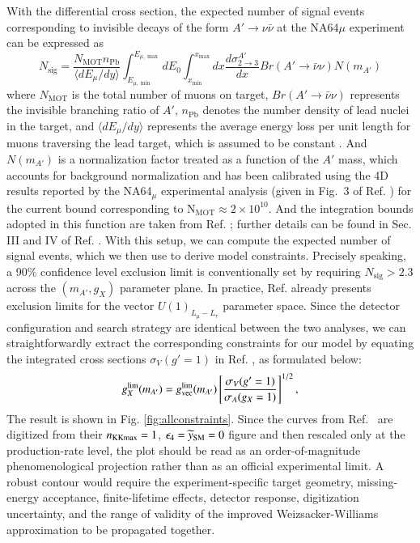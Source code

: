 \documentclass[onecolumn, aps, nofootinbib, prd, preprint, floats, floatfix, amsmath, amssymb, superscriptaddress, preprintnumbers]{revtex4-1}
\begin{document}
With the differential cross section, the expected number of signal events corresponding to invisible decays of the form $A' \to \nu\bar{\nu}$ at the NA64$\mu$ experiment can be expressed as
\begin{equation}
N_{\text{sig}} = \frac{N_{\text{MOT}} n_{\text{Pb}}}{\langle dE_\mu/dy \rangle} \int_{E_{\mu,\min}}^{E_{\mu,\max}} dE_0 \int_{x_{\min}}^{x_{\max}} dx \frac{d\sigma_{2\to3}^{A'}}{dx} Br(A' \to \bar{\nu}\nu) N(m_{A'})
\label{eq:NA64Signal}
\end{equation}
where $N_{\text{MOT}}$ is the total number of muons on target, $Br(A'\to\bar{\nu}\nu)$ represents the invisible branching ratio of $A'$, $n_{\text{Pb}}$ denotes the number density of lead nuclei in the target, and $\langle dE_\mu/dy\rangle$ represents the average energy loss per unit length for muons traversing the lead target, which is assumed to be constant \cite{navas2024review}. And $N(m_{A'})$ is a normalization factor treated as a function of the $A'$ mass, which accounts for background normalization and has been calibrated using the 4D results reported by the NA64$_\mu$ experimental analysis (given in Fig.~3 of Ref. \cite{andreev2024exploration}) for the current bound corresponding to $\mathrm{N_{MOT}} \approx 2 \times 10^{10}$. And the integration bounds adopted in this function are taken from Ref. \cite{Chakraborty:2025jbd}; further details can be found in Sec. III and IV of Ref. \cite{Chakraborty:2025jbd}. With this setup, we can compute the expected number of signal events, which we then use to derive model constraints. Precisely speaking, a 90\% confidence level exclusion limit is conventionally set by requiring $N_{\text{sig}} > 2.3$ across the $(m_{A'}, g_X)$ parameter plane. In practice, Ref. \cite{Chakraborty:2025jbd} already presents exclusion limits for the vector $U(1)_{L_\mu-L_\tau}$ parameter space. Since the detector configuration and search strategy are identical between the two analyses, we can straightforwardly extract the corresponding constraints for our model by equating the integrated cross sections $\sigma_V(g'=1)$ in Ref. \cite{Chakraborty:2025jbd}, as formulated below:
\begin{equation}
g_X^{\rm lim}(m_{A'})
=g_{\rm vec}^{\rm lim}(m_{A'})
\left[
\frac{\sigma_V(g'=1)}{\sigma_A(g_X=1)}
\right]^{1/2},
\label{eq:beamdump-rescale}
\end{equation}
The result is shown in Fig. \ref{fig:allconstraints}. Since the curves from Ref.~\cite{Chakraborty:2025jbd} are digitized from their $n_{\rm KKmax}=1$, $\epsilon_4=\widetilde y_{\rm SM}=0$ figure and then rescaled only at the production-rate level, the plot should be read as an order-of-magnitude phenomenological projection rather than as an official experimental limit. A robust contour would require the experiment-specific target geometry, missing-energy acceptance, finite-lifetime effects, detector response, digitization uncertainty, and the range of validity of the improved Weizsacker-Williams approximation to be propagated together.
\end{document}
